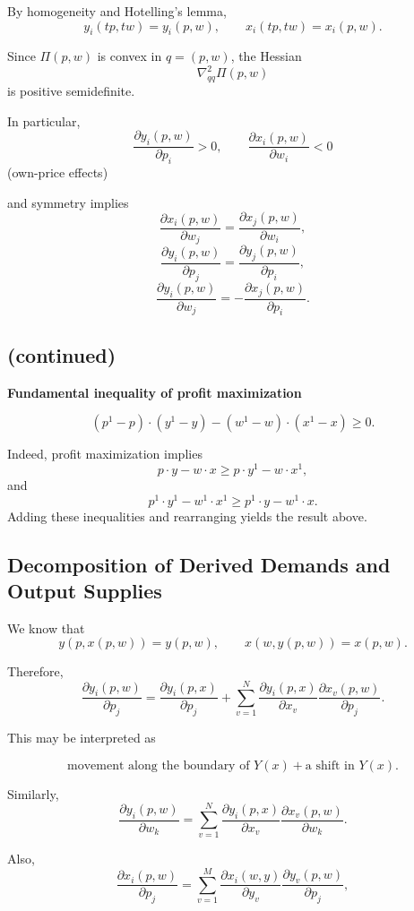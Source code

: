 By homogeneity and Hotelling's lemma,
\[
y_i(tp,tw)=y_i(p,w),
\qquad
x_i(tp,tw)=x_i(p,w).
\]

Since $\Pi(p,w)$ is convex in $q=(p,w)$, the Hessian
\[
\nabla_{qq}^2 \Pi(p,w)
\]
is positive semidefinite.

\medskip

In particular,
\[
\frac{\partial y_i(p,w)}{\partial p_i} > 0,
\qquad
\frac{\partial x_i(p,w)}{\partial w_i} < 0
\]
\hfill (own-price effects)

and symmetry implies
\[
\frac{\partial x_i(p,w)}{\partial w_j}
=
\frac{\partial x_j(p,w)}{\partial w_i},
\]
\[
\frac{\partial y_i(p,w)}{\partial p_j}
=
\frac{\partial y_j(p,w)}{\partial p_i},
\]
\[
\frac{\partial y_i(p,w)}{\partial w_j}
=
-\frac{\partial x_j(p,w)}{\partial p_i}.
\]


\subsection*{(continued)}

\textbf{Fundamental inequality of profit maximization}

\[
(p^1-p)\cdot (y^1-y) - (w^1-w)\cdot (x^1-x) \ge 0.
\]

Indeed, profit maximization implies
\[
p\cdot y - w\cdot x \ge p\cdot y^1 - w\cdot x^1,
\]
and
\[
p^1 \cdot y^1 - w^1 \cdot x^1 \ge p^1 \cdot y - w^1 \cdot x.
\]
Adding these inequalities and rearranging yields the result above.

\subsection*{Decomposition of Derived Demands and Output Supplies}

We know that
\[
y(p,x(p,w)) = y(p,w),
\qquad
x(w,y(p,w)) = x(p,w).
\]

Therefore,
\[
\frac{\partial y_i(p,w)}{\partial p_j}
=
\frac{\partial y_i(p,x)}{\partial p_j}
+
\sum_{v=1}^N
\frac{\partial y_i(p,x)}{\partial x_v}
\frac{\partial x_v(p,w)}{\partial p_j}.
\]

This may be interpreted as

\[
\text{movement along the boundary of } Y(x)
+
\text{a shift in } Y(x).
\]

Similarly,
\[
\frac{\partial y_i(p,w)}{\partial w_k}
=
\sum_{v=1}^N
\frac{\partial y_i(p,x)}{\partial x_v}
\frac{\partial x_v(p,w)}{\partial w_k}.
\]

Also,
\[
\frac{\partial x_i(p,w)}{\partial p_j}
=
\sum_{v=1}^M
\frac{\partial x_i(w,y)}{\partial y_v}
\frac{\partial y_v(p,w)}{\partial p_j},
\]

